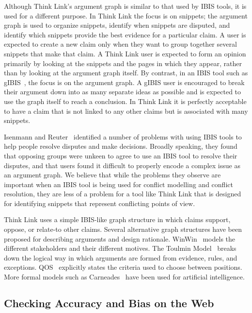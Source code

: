 \documentclass{chi2009}
\begin{document}
Although Think Link's argument graph is similar to that used by IBIS tools, it is used for a different purpose. 
In Think Link the focus is on snippets; the argument graph is used to organize snippets, identify when snippets are disputed, and identify which snippets provide the best evidence for a particular claim. 
A user is expected to create a new claim only when they want to group together several snippets that make that claim. 
A Think Link user is expected to form an opinion primarily by looking at the snippets and the pages in which they appear, rather than by looking at the argument graph itself. By contrast, in an IBIS tool such as gIBIS~\cite{Conklin1987a}, the focus is on the argument graph. A gIBIS user is encouraged to break their argument down into as many separate ideas as possible and is expected to use the graph itself to reach a conclusion. In Think Link it is perfectly acceptable to have a claim that is not linked to any other claims but is associated with many snippets.

Isenmann and Reuter~\cite{Isenmann1997} identified a number of problems with using IBIS tools to help people resolve disputes and make decisions. Broadly speaking, they found that opposing groups were unkeen to agree to use an IBIS tool to resolve their disputes, and that users found it difficult to properly encode a complex issue as an argument graph. We believe that while the problems they observe are important when an IBIS tool is being used for conflict modelling and conflict resolution, they are less of a problem for a tool like Think Link that is designed for identifying snippets that represent conflicting points of view.

Think Link uses a simple IBIS-like graph structure in which claims support, oppose, or relate-to other claims. Several alternative graph structures have been proposed for describing arguments and design rationale. WinWin~\cite{Boehm2006} models the different stakeholders and their different motives. The Toulmin Model~\cite{toulmin1958} breaks down the logical way in which arguments are formed from evidence, rules, and exceptions. QOS~\cite{Maclean1991} explicitly states the criteria used to choose between positions. More formal models such as Carneades~\cite{Gordon2007} have been used for artificial intelligence.

\subsection{Checking Accuracy and Bias on the Web}
\end{document}

